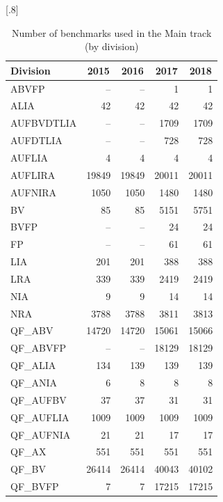\documentclass[dvipsnames,table,twoside,11pt]{article}
\begin{document}
\begin{table}
  \caption{Number of benchmarks used in the Main track (by division)}
  \label{table:benchmarks-main-track}
  \centering
  \scalebox{.9}[.8]{\begin{tabular}{lrrrr}
    \toprule
    Division & \multicolumn{1}{c}{2015} & \multicolumn{1}{c}{2016} & \multicolumn{1}{c}{2017} & \multicolumn{1}{c}{2018} \\
    \midrule
    ABVFP      &     -- &     -- &      1 &     1 \\
    ALIA       &     42 &     42 &     42 &    42 \\
    AUFBVDTLIA &     -- &     -- &   1709 &  1709 \\
    AUFDTLIA   &     -- &     -- &    728 &   728 \\
    AUFLIA     &      4 &      4 &      4 &     4 \\
    AUFLIRA    &  19849 &  19849 &  20011 & 20011 \\
    AUFNIRA    &   1050 &   1050 &   1480 &  1480 \\
    BV         &     85 &     85 &   5151 &  5751 \\
    BVFP       &     -- &     -- &     24 &    24 \\
    FP         &     -- &     -- &     61 &    61 \\
    LIA        &    201 &    201 &    388 &   388 \\
    LRA        &    339 &    339 &   2419 &  2419 \\
    NIA        &      9 &      9 &     14 &    14 \\
    NRA        &   3788 &   3788 &   3811 &  3813 \\
    QF\_ABV    &  14720 &  14720 &  15061 & 15066 \\
    QF\_ABVFP  &     -- &     -- &  18129 & 18129 \\
    QF\_ALIA   &    134 &    139 &    139 &   139 \\
    QF\_ANIA   &      6 &      8 &      8 &     8 \\
    QF\_AUFBV  &     37 &     37 &     31 &    31 \\
    QF\_AUFLIA &   1009 &   1009 &   1009 &  1009 \\
    QF\_AUFNIA &     21 &     21 &     17 &    17 \\
    QF\_AX     &    551 &    551 &    551 &   551 \\
    QF\_BV     &  26414 &  26414 &  40043 & 40102 \\
    QF\_BVFP   &      7 &      7 &  17215 & 17215 \\

\end{tabular}}
\end{table}
\end{document}
